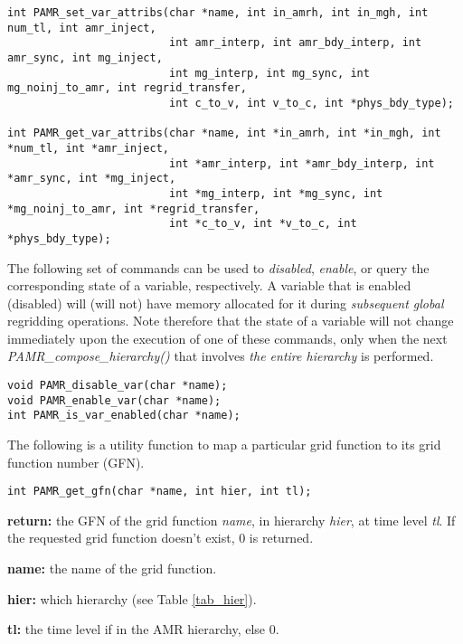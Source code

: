 \documentclass[aps,amssymb,unsortedaddress,nofootinbib]{revtex4}
\def\lsep{\itemsep 0.05in}
\begin{document}
\begin{verbatim}
int PAMR_set_var_attribs(char *name, int in_amrh, int in_mgh, int num_tl, int amr_inject,
                         int amr_interp, int amr_bdy_interp, int amr_sync, int mg_inject, 
                         int mg_interp, int mg_sync, int mg_noinj_to_amr, int regrid_transfer, 
                         int c_to_v, int v_to_c, int *phys_bdy_type);
                         
int PAMR_get_var_attribs(char *name, int *in_amrh, int *in_mgh, int *num_tl, int *amr_inject,
                         int *amr_interp, int *amr_bdy_interp, int *amr_sync, int *mg_inject, 
                         int *mg_interp, int *mg_sync, int *mg_noinj_to_amr, int *regrid_transfer, 
                         int *c_to_v, int *v_to_c, int *phys_bdy_type);
\end{verbatim}


\noindent
The following set of commands can be used to {\em disabled}, {\em enable}, or 
query the corresponding state of a variable, respectively. A variable that is
enabled (disabled) will (will not) have memory allocated for it during 
{\em subsequent global} regridding operations. 
Note therefore that the state of a variable will not change 
immediately upon the execution of one of these commands, only when the 
next {\em PAMR\_compose\_hierarchy()} that 
involves {\em the entire hierarchy} is performed.

\begin{verbatim}
void PAMR_disable_var(char *name);
void PAMR_enable_var(char *name);
int PAMR_is_var_enabled(char *name);
\end{verbatim}


The following is a utility function to map a particular grid function to
its grid function number (GFN).

\begin{verbatim}
int PAMR_get_gfn(char *name, int hier, int tl);
\end{verbatim}
\begin{list}{}{\lsep}
\item {\bf return:} the GFN of the grid function
                    {\em name}, in hierarchy {\em hier}, at time level {\em tl}.
                    If the requested grid function doesn't exist, 0 is returned.
\item {\bf *name:} the name of the grid function.
\item {\bf hier:} which hierarchy (see Table \ref{tab_hier}).
\item {\bf tl:} the time level if in the AMR hierarchy, else 0.
\end{list}
\end{document}
